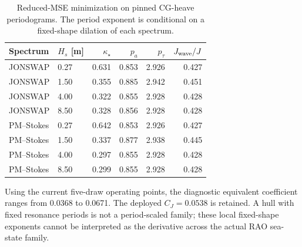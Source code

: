 \begin{table}[t]\centering
\caption{Reduced-MSE minimization on pinned CG-heave periodograms.
The period exponent is conditional on a fixed-shape dilation of each spectrum.}
\label{tab:adapt-exact-mse-exponents}\footnotesize
\begin{tabular}{@{}llrrrr@{}}\toprule
Spectrum & $H_s$ [m] & $\kappa_\star$ & $p_a$ & $p_\tau$ & $J_{\rm wave}/J$ \\
\midrule
JONSWAP & 0.27 & 0.631 & 0.853 & 2.926 & 0.427 \\
JONSWAP & 1.50 & 0.355 & 0.885 & 2.942 & 0.451 \\
JONSWAP & 4.00 & 0.322 & 0.855 & 2.928 & 0.428 \\
JONSWAP & 8.50 & 0.328 & 0.856 & 2.928 & 0.428 \\
PM--Stokes & 0.27 & 0.642 & 0.853 & 2.926 & 0.427 \\
PM--Stokes & 1.50 & 0.337 & 0.877 & 2.938 & 0.445 \\
PM--Stokes & 4.00 & 0.297 & 0.855 & 2.928 & 0.428 \\
PM--Stokes & 8.50 & 0.299 & 0.855 & 2.928 & 0.428 \\
\bottomrule\end{tabular}\end{table}
Using the current five-draw operating points, the diagnostic equivalent
coefficient ranges from \num{0.0368} to \num{0.0671}.
The deployed $C_J=0.0538$ is retained. A hull with fixed resonance periods
is not a period-scaled family; these local fixed-shape exponents cannot
be interpreted as the derivative across the actual RAO sea-state family.
